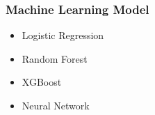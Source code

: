 \documentclass[UTF8,aspectratio=1610,10pt]{ctexbeamer}
\begin{document}
\begin{frame}
	\frametitle{Machine Learning Model}
\begin{itemize}
  \item Logistic Regression
  \item Random Forest
  \item XGBoost
  \item Neural Network
\end{itemize}

\end{frame}
\end{document}
